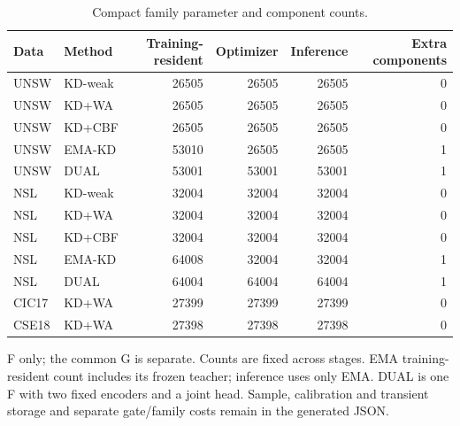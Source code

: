 \begin{table}[t]
\centering\scriptsize
\setlength{\tabcolsep}{3.3pt}
\caption{Compact family parameter and component counts.}\label{tab:compact-capacity}
\begin{tabular}{llrrrr}
\toprule
Data & Method & Training-resident & Optimizer & Inference & Extra components \\
\midrule
UNSW & KD-weak & 26505 & 26505 & 26505 & 0 \\
UNSW & KD+WA & 26505 & 26505 & 26505 & 0 \\
UNSW & KD+CBF & 26505 & 26505 & 26505 & 0 \\
UNSW & EMA-KD & 53010 & 26505 & 26505 & 1 \\
UNSW & DUAL & 53001 & 53001 & 53001 & 1 \\
NSL & KD-weak & 32004 & 32004 & 32004 & 0 \\
NSL & KD+WA & 32004 & 32004 & 32004 & 0 \\
NSL & KD+CBF & 32004 & 32004 & 32004 & 0 \\
NSL & EMA-KD & 64008 & 32004 & 32004 & 1 \\
NSL & DUAL & 64004 & 64004 & 64004 & 1 \\
CIC17 & KD+WA & 27399 & 27399 & 27399 & 0 \\
CSE18 & KD+WA & 27398 & 27398 & 27398 & 0 \\
\bottomrule
\end{tabular}
\par\smallskip\begin{minipage}{0.98\textwidth}\scriptsize F only; the common G is separate. Counts are fixed across stages. EMA training-resident count includes its frozen teacher; inference uses only EMA. DUAL is one F with two fixed encoders and a joint head. Sample, calibration and transient storage and separate gate/family costs remain in the generated JSON.\end{minipage}
\end{table}

